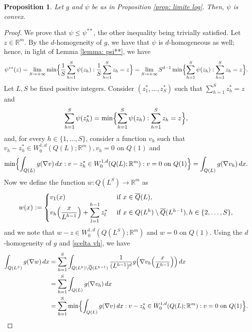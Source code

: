 \documentclass{article}
\theoremstyle{plain}
\newtheorem{proposition}[theorem]{Proposition}
\theoremstyle{definition}
\def\rr{{\mathbb R}}
\newcommand{\Q}
{\overline{Q}}
\numberwithin{equation}{section}
\begin{document}
\begin{proposition}\label{prop: convexity} Let $g$ and $\psi$ be as in Proposition \ref{prop: limite log}. Then, $\psi$ is convex.    
\end{proposition}
\begin{proof}
We prove that $\psi \leq \psi^{**}$, the other inequality being trivially satisfied. Let $z\in\rr^m$. By the $d$-homogeneity of $g$, we have that $\psi$ is $d$-homogeneous as well; hence, in light of Lemma \ref{lemma: psi**}, we have
 \begin{equation}\label{psi**}
     \psi^{**}(z)=\lim_{S\to+\infty}\min\Bigl\{\frac{1}{S}\sum_{h=1}^S\psi(z_h): \frac{1}{S}\sum_{h=1}^Sz_h=z\Bigr\}=\lim_{S\to+\infty}S^{d-1}\min\Bigl\{\sum_{h=1}^S\psi(z_h):\sum_{h=1}^Sz_h=z\Bigr\}.
 \end{equation}
Let $L,S$ be fixed positive integers. Consider $(z_1^*,\dots,z_S^*)$ such that $\sum_{h=1}^Sz^*_h=z$ and
\begin{equation}\label{scelta zh}
    \sum_{h=1}^S\psi(z^*_h)= \min\Bigl\{\sum_{h=1}^S\psi(z_h):\sum_{h=1}^Sz_h=z\Bigr\},
\end{equation}
and, for every $h\in\{1,\dots,S\}$, consider a function $v_h$ such that $v_h-z_h^*\in W^{1,d}_0(Q(L);\rr^m), v_h=0$ on $Q(1)$ and 
\begin{equation}\label{scelta vh}
    \min\Bigl\{\int_{Q(L)}g(\nabla v)\, dx : v-z_h^*\in W^{1,d}_0(Q(L); \rr^m): v=0 \text{ on } Q(1)\Bigr\}= \int_{Q(L)}g(\nabla v_h)\,dx.
\end{equation}
 Now we define the function $w:Q(L^S)\to\rr^m$ as
\begin{equation*}
    w(x):=\begin{cases}
    v_1(x) & \text{ if } x\in \Q(L), \\
        v_h\Bigl(\displaystyle\frac{x}{L^{h-1}}\Bigr)+\displaystyle\sum_{l=1}^{h-1}z_l^* & \text{ if } x\in Q(L^{h})\setminus \Q(L^{h-1}), h\in\{2,\dots,S\},
    \end{cases}
\end{equation*}
and we note that $w-z\in W^{1,d}_0(Q(L^S);\rr^m)$ and $w=0$ on $Q(1)$. Using the $d$-homogeneity of $g$ and \eqref{scelta vh}, we have
\begin{align*}
    \int_{Q(L^S)}g(\nabla w)\,dx & = \sum_{h=1}^S \int_{Q(L^{h})\setminus\Q(L^{h-1})} \frac{1}{(L^{h-1})^d}g\Bigl(\nabla v_h\Bigl(\frac{x}{L^{h-1}}\Bigr)\Bigr)\,dx \\
    & =  \sum_{h=1}^S \int_{Q(L)}g(\nabla v_h)\,dx \\
    & = \sum_{h=1}^S     \min\Bigl\{\int_{Q(L)}g(\nabla v)\, dx : v-z_h^*\in W^{1,d}_0(Q(L); \rr^m): v=0 \text{ on } Q(1)\Bigr\}.

\end{align*}
\end{proof}
\end{document}
